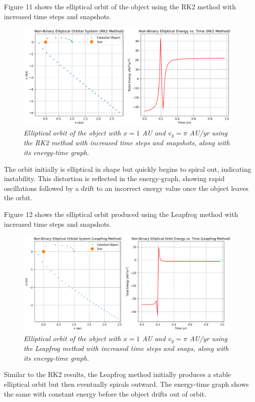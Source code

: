 \documentclass[11 pt, a4paper, twocolumn]{article}
\begin{document}
Figure 11 shows the elliptical orbit of the object using the RK2 method with increased time steps and
snapshots.
\begin{figure}[H]
  \includegraphics[width=1\linewidth]{RK2/rk2ellipticincrease.png}
  \centering
  \caption{\textit{Elliptical orbit of the object with $x = 1$ AU and $v_y = \pi$ AU/yr using the
  RK2 method with increased time steps and snapshots, along with its energy-time graph.}} 
\end{figure}
The orbit initially is elliptical in shape but quickly begins to spiral out, indicating instability.
This distortion is reflected in the energy-graph, showing rapid oscillations followed by a drift to
an incorrect energy value once the object leaves the orbit.

Figure 12 shows the elliptical orbit produced using the Leapfrog method with increased time steps
and snapshots.
\begin{figure}[H]
  \includegraphics[width=1\linewidth]{Leapfrog/leapfrogellipticincrease.png}
  \centering
  \caption{\textit{Elliptical orbit of the object with $x = 1$ AU and $v_y = \pi$ AU/yr using the 
  Leapfrog method with increased time steps and snaps, along with its energy-time graph.}} 
\end{figure}
\vspace{-3em}
Similar to the RK2 results, the Leapfrog method initially produces a stable elliptical orbit but then
eventually spirals outward. The energy-time graph shows the same with constant energy before the object
drifts out of orbit.
\vspace{-2em}
\end{document}

